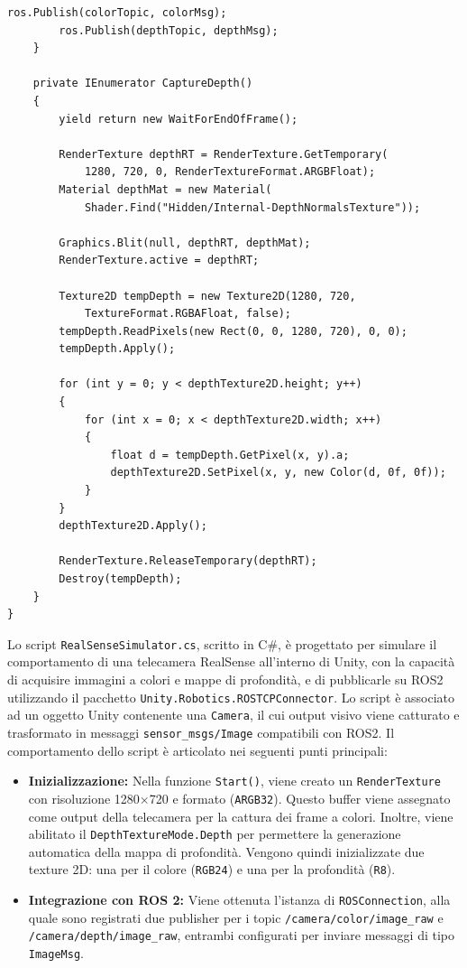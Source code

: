 \documentclass[11pt]{report}
\begin{document}
\begin{lstlisting}[caption=Publisher di Unity, label=lst:base, lineskip=0.3em]
        ros.Publish(colorTopic, colorMsg);
        ros.Publish(depthTopic, depthMsg);
    }

    private IEnumerator CaptureDepth()
    {
        yield return new WaitForEndOfFrame();
        
        RenderTexture depthRT = RenderTexture.GetTemporary(
            1280, 720, 0, RenderTextureFormat.ARGBFloat);
        Material depthMat = new Material(
            Shader.Find("Hidden/Internal-DepthNormalsTexture"));
        
        Graphics.Blit(null, depthRT, depthMat);
        RenderTexture.active = depthRT;
        
        Texture2D tempDepth = new Texture2D(1280, 720, 
            TextureFormat.RGBAFloat, false);
        tempDepth.ReadPixels(new Rect(0, 0, 1280, 720), 0, 0);
        tempDepth.Apply();

        for (int y = 0; y < depthTexture2D.height; y++)
        {
            for (int x = 0; x < depthTexture2D.width; x++)
            {
                float d = tempDepth.GetPixel(x, y).a;
                depthTexture2D.SetPixel(x, y, new Color(d, 0f, 0f));
            }
        }
        depthTexture2D.Apply();

        RenderTexture.ReleaseTemporary(depthRT);
        Destroy(tempDepth);
    }
}
\end{lstlisting}
\vspace{1em} %
Lo script \texttt{RealSenseSimulator.cs}, scritto in C\#, è progettato per simulare il comportamento di una telecamera RealSense all'interno di Unity, con la capacità di acquisire immagini a colori e mappe di profondità, e di pubblicarle su ROS2 utilizzando il pacchetto \texttt{Unity.Robotics.ROSTCPConnector}.
\newline
Lo script è associato ad un oggetto Unity contenente una \texttt{Camera}, il cui output visivo viene catturato e trasformato in messaggi \texttt{sensor\_msgs/Image} compatibili con ROS2. Il comportamento dello script è articolato nei seguenti punti principali:

\begin{itemize}
  \item \textbf{Inizializzazione:} Nella funzione \texttt{Start()}, viene creato un \texttt{RenderTexture} con risoluzione 1280$\times$720 e formato (\texttt{ARGB32}). Questo buffer viene assegnato come output della telecamera per la cattura dei frame a colori. Inoltre, viene abilitato il \texttt{DepthTextureMode.Depth} per permettere la generazione automatica della mappa di profondità. Vengono quindi inizializzate due texture 2D: una per il colore (\texttt{RGB24}) e una per la profondità (\texttt{R8}).
  
  \item \textbf{Integrazione con ROS 2:} Viene ottenuta l’istanza di \texttt{ROSConnection}, alla quale sono registrati due publisher per i topic \texttt{/camera/color/image\_raw} e \texttt{/camera/depth/image\_raw}, entrambi configurati per inviare messaggi di tipo \texttt{ImageMsg}.
\end{itemize}
\end{document}
